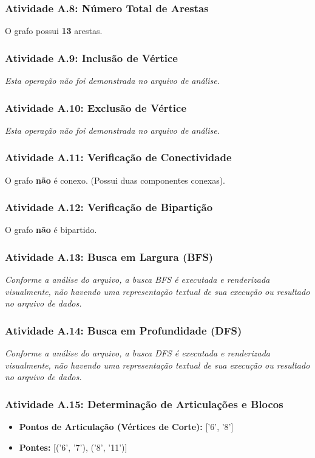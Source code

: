 \documentclass[a4paper,12pt]{article}
\begin{document}
\subsubsection*{Atividade A.8: Número Total de Arestas}
O grafo possui \textbf{13} arestas.

\subsubsection*{Atividade A.9: Inclusão de Vértice}
\textit{Esta operação não foi demonstrada no arquivo de análise.}

\subsubsection*{Atividade A.10: Exclusão de Vértice}
\textit{Esta operação não foi demonstrada no arquivo de análise.}

\subsubsection*{Atividade A.11: Verificação de Conectividade}
O grafo \textbf{não} é conexo. (Possui duas componentes conexas).

\subsubsection*{Atividade A.12: Verificação de Bipartição}
O grafo \textbf{não} é bipartido.

\subsubsection*{Atividade A.13: Busca em Largura (BFS)}
\textit{Conforme a análise do arquivo, a busca BFS é executada e renderizada visualmente, não havendo uma representação textual de sua execução ou resultado no arquivo de dados.}

\subsubsection*{Atividade A.14: Busca em Profundidade (DFS)}
\textit{Conforme a análise do arquivo, a busca DFS é executada e renderizada visualmente, não havendo uma representação textual de sua execução ou resultado no arquivo de dados.}

\subsubsection*{Atividade A.15: Determinação de Articulações e Blocos}
\begin{itemize}[nosep, leftmargin=*]
    \item \textbf{Pontos de Articulação (Vértices de Corte):} ['6', '8']
    \item \textbf{Pontes:} [('6', '7'), ('8', '11')]
\end{itemize}
\end{document}

